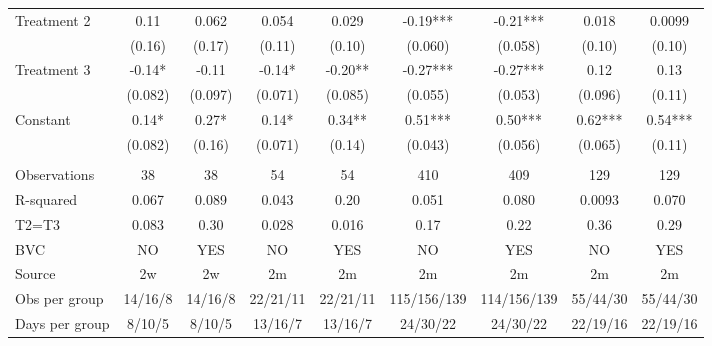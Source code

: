\begin{tabular}{lcccccccc}
\midrule
\midrule
Treatment 2 & 0.11  & 0.062 & 0.054 & 0.029 & -0.19*** & -0.21*** & 0.018 & 0.0099 \\
      & (0.16) & (0.17) & (0.11) & (0.10) & (0.060) & (0.058) & (0.10) & (0.10) \\
Treatment 3 & -0.14* & -0.11 & -0.14* & -0.20** & -0.27*** & -0.27*** & 0.12  & 0.13 \\
      & (0.082) & (0.097) & (0.071) & (0.085) & (0.055) & (0.053) & (0.096) & (0.11) \\
Constant  & 0.14* & 0.27* & 0.14* & 0.34** & 0.51*** & 0.50*** & 0.62*** & 0.54*** \\
      & (0.082) & (0.16) & (0.071) & (0.14) & (0.043) & (0.056) & (0.065) & (0.11) \\
      &       &       &       &       &       &       &       &  \\
\midrule
Observations & 38    & 38    & 54    & 54    & 410   & 409   & 129   & 129 \\
R-squared & 0.067 & 0.089 & 0.043 & 0.20  & 0.051 & 0.080 & 0.0093 & 0.070 \\
T2=T3 & 0.083 & 0.30  & 0.028 & 0.016 & 0.17  & 0.22  & 0.36  & 0.29 \\
BVC   & NO    & YES   & NO    & YES   & NO    & YES   & NO    & YES \\
Source & 2w    & 2w    & 2m    & 2m    & 2m    & 2m    & 2m    & 2m \\
Obs per group & 14/16/8 & 14/16/8 & 22/21/11 & 22/21/11 & 115/156/139 & 114/156/139 & 55/44/30 & 55/44/30 \\
Days per group & 8/10/5 & 8/10/5 & 13/16/7 & 13/16/7 & 24/30/22 & 24/30/22 & 22/19/16 & 22/19/16 \\
\bottomrule
\bottomrule
\end{tabular}%
